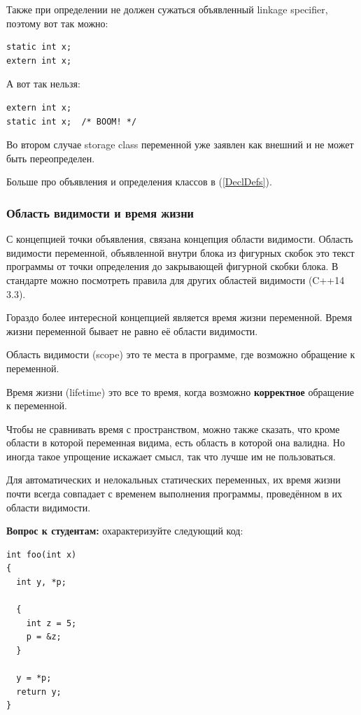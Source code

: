 \documentclass[a4paper,12pt,oneside]{article}
\begin{document}
Также при определении не должен сужаться объявленный linkage specifier, поэтому вот так можно:

\begin{lstlisting}
static int x;
extern int x;
\end{lstlisting}

А вот так нельзя:

\begin{lstlisting}
extern int x;
static int x;  /* BOOM! */
\end{lstlisting}

Во втором случае storage class переменной уже заявлен как внешний и не может быть переопределен.

Больше про объявления и определения классов в (\ref{DeclDefs}).

\subsubsection{Область видимости и время жизни}\label{ScopeLifeTime}

С концепцией точки объявления, связана концепция области видимости. Область видимости  переменной, объявленной внутри блока из фигурных скобок это текст программы от точки определения до закрывающей фигурной скобки блока. В стандарте можно посмотреть правила для других областей видимости (C++14 3.3).

Гораздо более интересной концепцией является время жизни переменной. Время жизни переменной бывает не равно её области видимости.

Область видимости (scope) это те места в программе, где возможно обращение к переменной.

Время жизни (lifetime) это все то время, когда возможно \textbf{корректное} обращение к переменной.

Чтобы не сравнивать время с пространством, можно также сказать, что кроме области в которой переменная видима, есть область в которой она валидна. Но иногда такое упрощение искажает смысл, так что лучше им не пользоваться.

Для автоматических и нелокальных статических переменных, их время жизни почти всегда совпадает с временем выполнения программы, проведённом в их области видимости.

\textbf{Вопрос к студентам:} охарактеризуйте следующий код:

\begin{lstlisting}
int foo(int x) 
{
  int y, *p;

  {
    int z = 5; 
    p = &z;
  }

  y = *p;
  return y;
}
\end{lstlisting}
\end{document}
